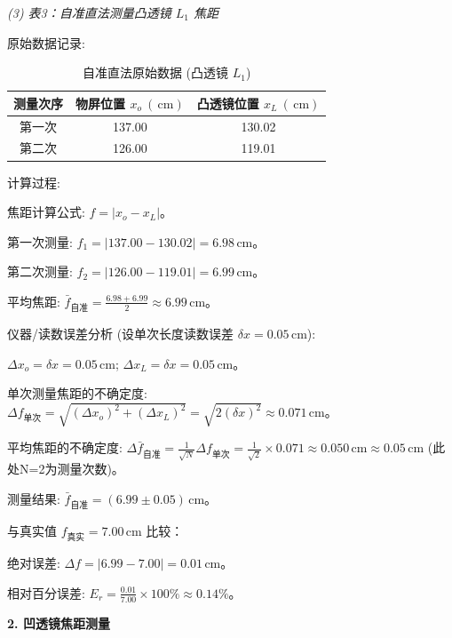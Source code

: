 ﻿\documentclass[12pt,a4paper]{article}
\newcommand{\rmcm}{\mathrm{\,cm}}
\begin{document}
\noindent\textit{(3) 表3：自准直法测量凸透镜 $L_1$ 焦距}
\par\noindent 原始数据记录:
\begin{table}[H]
    \centering
    \caption{自准直法原始数据 (凸透镜 $L_1$)}
    \begin{tabular}{ccc}
        \toprule[1.5pt]
        测量次序 & 物屏位置 $x_o~(\rmcm)$ & 凸透镜位置 $x_L~(\rmcm)$ \\
        \midrule
        第一次 & 137.00 & 130.02 \\
        第二次 & 126.00 & 119.01 \\
        \bottomrule[1.5pt]
    \end{tabular}
    \label{tab:convex_autocollimation_raw_refined}
\end{table}
\par\noindent 计算过程:
\par 焦距计算公式: $f = |x_o - x_L|$。
\par 第一次测量: $f_1 = |137.00 - 130.02| = 6.98 \rmcm$。
\par 第二次测量: $f_2 = |126.00 - 119.01| = 6.99 \rmcm$。
\par 平均焦距: $\bar{f}_{\text{自准}} = \frac{6.98+6.99}{2} \approx 6.99 \rmcm$。
\par\noindent 仪器/读数误差分析 (设单次长度读数误差 $\delta x = 0.05 \rmcm$):
\par $\Delta x_o = \delta x = 0.05 \rmcm$; $\Delta x_L = \delta x = 0.05 \rmcm$。
\par 单次测量焦距的不确定度: $\Delta f_{\text{单次}} = \sqrt{(\Delta x_o)^2 + (\Delta x_L)^2} = \sqrt{2(\delta x)^2} \approx 0.071 \rmcm$。
\par 平均焦距的不确定度: $\Delta \bar{f}_{\text{自准}} = \frac{1}{\sqrt{N}} \Delta f_{\text{单次}} = \frac{1}{\sqrt{2}} \times 0.071 \approx 0.050 \rmcm \approx 0.05 \rmcm$ (此处N=2为测量次数)。
\par 测量结果: $\bar{f}_{\text{自准}} = (6.99 \pm 0.05) \rmcm$。
\par 与真实值 $f_{\text{真实}} = 7.00 \rmcm$ 比较：
\par 绝对误差: $\Delta f = |6.99 - 7.00| = 0.01 \rmcm$。
\par 相对百分误差: $E_r = \frac{0.01}{7.00} \times 100\% \approx 0.14\%$。

\noindent\textbf{2. 凹透镜焦距测量}
\end{document}
